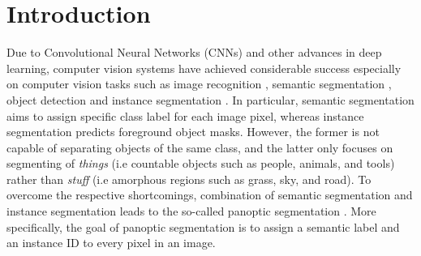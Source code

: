 \documentclass[runningheads]{llncs}
\begin{document}
\section{Introduction}

Due to Convolutional Neural Networks (CNNs) and other advances in deep learning, computer vision systems have achieved considerable success especially on computer vision tasks such as image recognition \cite{He2016}, semantic segmentation \cite{Zhao2016,Chen2018}, object detection \cite{Ren2017,Redmon2017} and instance segmentation \cite{He2017,Liu}. In particular, semantic segmentation aims to assign specific class label for each image pixel, whereas instance segmentation predicts foreground object masks. However, the former is not capable of separating objects of the same class, and the latter only focuses on segmenting of \emph{things} (i.e countable objects such as people, animals, and tools) rather than \emph{stuff} (i.e amorphous regions such as grass, sky, and road). 
To overcome the respective shortcomings, combination of semantic segmentation and instance segmentation leads to the so-called panoptic segmentation \cite{Li2018}. More specifically, the goal of panoptic segmentation is to assign a semantic label and an instance ID to every pixel in an image.
\end{document}
